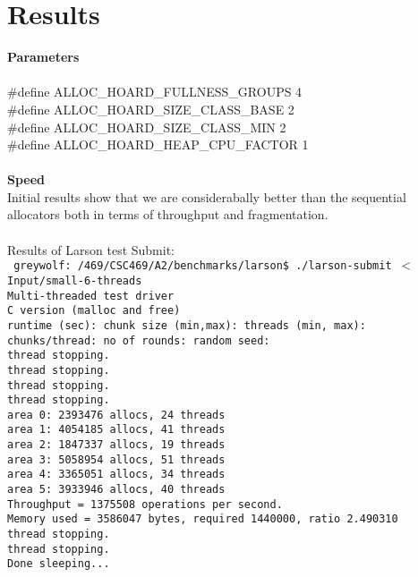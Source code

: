 \documentclass{article}
\begin{document}
\newpage
\noindent
\section{Results}
\textbf{Parameters}
\\
\\
\#define ALLOC\_HOARD\_FULLNESS\_GROUPS 4
\\
\#define ALLOC\_HOARD\_SIZE\_CLASS\_BASE 2
\\
\#define ALLOC\_HOARD\_SIZE\_CLASS\_MIN 2
\\
\#define ALLOC\_HOARD\_HEAP\_CPU\_FACTOR 1
\\
\\
\textbf{Speed}
\\
\indent Initial results show that we are considerabally better than the sequential allocators both in terms of throughput and fragmentation.
\\
\\
Results of Larson test Submit:
\\
\texttt{
greywolf:~/469/CSC469/A2/benchmarks/larson\$  ./larson-submit $<$ Input/small-6-threads
\\
Multi-threaded test driver 
\\
C version (malloc and free)
\\
runtime (sec): chunk size (min,max): threads (min, max):   chunks/thread:  no of rounds:   random seed:    
\\
thread stopping.
\\
thread stopping.
\\
thread stopping.
\\
thread stopping.
\\
area 0: 2393476 allocs, 24 threads
\\
area 1: 4054185 allocs, 41 threads
\\
area 2: 1847337 allocs, 19 threads
\\
area 3: 5058954 allocs, 51 threads
\\
area 4: 3365051 allocs, 34 threads
\\
area 5: 3933946 allocs, 40 threads
\\
Throughput =  1375508 operations per second.
\\
Memory used = 3586047 bytes, required 1440000, ratio 2.490310
\\
thread stopping.
\\
thread stopping.
\\
Done sleeping...}
\\
\\
\end{document}
